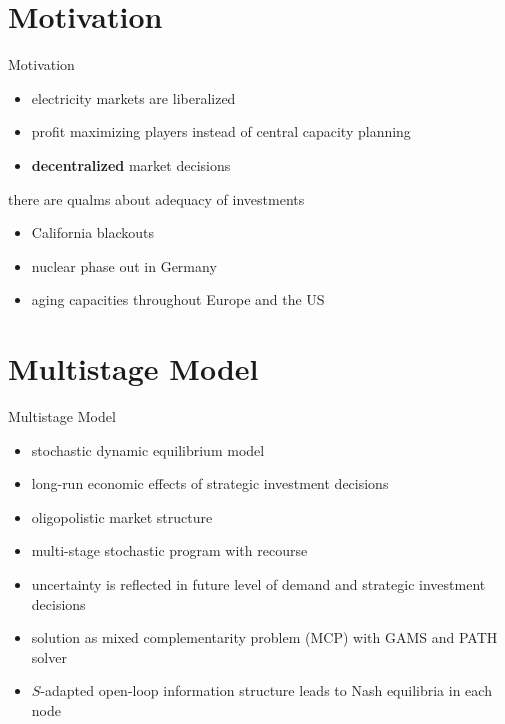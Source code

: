\section{Motivation}

\begin{frame}{Motivation}

\begin{itemize}
	\item electricity markets are liberalized
	\item profit maximizing players instead of central capacity planning 
	\item \textbf{decentralized} market decisions
\end{itemize}	

there are qualms about adequacy of investments
	
\begin{itemize}
	\item California blackouts
	\item nuclear phase out in Germany
	\item aging capacities throughout Europe and the US
\end{itemize}

\end{frame}

\section{Multistage Model}

\begin{frame}{Multistage Model}
  \begin{itemize}
  \item stochastic dynamic equilibrium model
  \item long-run economic effects of strategic investment decisions
  \item oligopolistic market structure
  \end{itemize}
  \begin{itemize}
  \item multi-stage stochastic program with recourse
  \item uncertainty is reflected in future level of demand and strategic investment decisions 
  \item solution as mixed complementarity problem (MCP) with GAMS and PATH solver
   \item $S$-adapted open-loop information structure leads to Nash equilibria in each node 
  \end{itemize}
\end{frame}



